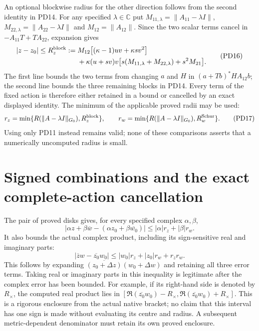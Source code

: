\documentclass[11pt]{article}
\newcommand{\C}{\mathbb C}
\begin{document}
An optional blockwise radius for the other direction follows from
the second identity in PD14.  For any specified $\lambda\in\C$ put
$M_{11,\lambda}=\|A_{11}-\lambda I\|$,
$M_{22,\lambda}=\|A_{22}-\lambda I\|$ and
$M_{12}=\|A_{12}\|$.  Since the two scalar terms cancel in
$-A_{11}T+TA_{22}$, expansion gives
\[
 \begin{split}
 |z-z_0|\le R_z^{\rm block}:={}&
 M_{12}\bigl[(\kappa-1)uv+\kappa s v^2\bigr]\\
 &+\kappa(u+sv)v
       \bigl[s(M_{11,\lambda}+M_{22,\lambda})+s^2M_{21}\bigr].
 \end{split}                                                      \tag{PD16}
\]
The first line bounds the two terms from changing $a$ and $H$
in $(a+Tb)^*HA_{12}b$; the second line bounds the three remaining
blocks in PD14.  Every term of the fixed action is therefore
either retained in a bound or cancelled by an exact displayed
identity.  The minimum of the applicable proved radii may be used:
\[
 r_z=\min\{R(\|A-\lambda I\|_{G_0}),R_z^{\rm block}\},\qquad
 r_w=\min\{R(\|A-\lambda I\|_{G_0}),R_w^{\rm Schur}\}.          \tag{PD17}
\]
Using only PD11 instead remains valid; none of these comparisons
asserts that a numerically uncomputed radius is small.

\section{Signed combinations and the exact complete-action cancellation}
The pair of proved disks gives, for every specified complex
$\alpha,\beta$,
\[
 \left|\alpha z+\beta\overline w
         -(\alpha z_0+\beta\overline{w_0})\right|
                        \le|\alpha|r_z+|\beta|r_w.              \tag{PD18}
\]
It also bounds the actual complex product, including its sign-sensitive
real and imaginary parts:
\[
 \boxed{|\overline z w-\overline{z_0}w_0|
       \le |w_0|r_z+|z_0|r_w+r_zr_w.}                           \tag{PD19}
\]
This follows by expanding
$\overline{(z_0+\Delta z)}(w_0+\Delta w)$ and retaining all three
error terms.  Taking real or imaginary parts in this inequality
is legitimate after the complex error has been bounded.  For
example, if its right-hand side is denoted by $R_\times$, the
computed real product lies in
$[\Re(\overline{z_0}w_0)-R_\times,
\Re(\overline{z_0}w_0)+R_\times]$.
This is a rigorous enclosure from the actual native bracket; no
claim that this interval has one sign is made without evaluating
its centre and radius.  A subsequent metric-dependent denominator
must retain its own proved enclosure.
\end{document}

